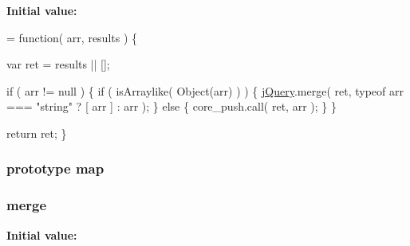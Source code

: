 {\bfseries Initial value\-:}
\begin{DoxyCode}
= \textcolor{keyword}{function}( arr, results ) \{


        var ret = results || [];

        \textcolor{keywordflow}{if} ( arr != null ) \{
            \textcolor{keywordflow}{if} ( isArraylike( Object(arr) ) ) \{
                \hyperlink{jquery-1_810_82-vsdoc_8js_add5237586d970a38a81f990e8eb28c6c}{jQuery}.merge( ret,
                    typeof arr === \textcolor{stringliteral}{"string"} ?
                    [ arr ] : arr
                );
            \} \textcolor{keywordflow}{else} \{
                core\_push.call( ret, arr );
            \}
        \}

        \textcolor{keywordflow}{return} ret;
    \}
\end{DoxyCode}
\hypertarget{jquery-1_810_82-vsdoc_8js_a20838f8c4bedc779e51bf830f5a4d471}{
\subsubsection[{map}]{ {\bf prototype} map}}\label{jquery-1_810_82-vsdoc_8js_a20838f8c4bedc779e51bf830f5a4d471}
\hypertarget{jquery-1_810_82-vsdoc_8js_a32b25eeaa50c1bd6453e8956949b36e3}{
\subsubsection[{merge}]{ merge}}\label{jquery-1_810_82-vsdoc_8js_a32b25eeaa50c1bd6453e8956949b36e3}
{\bfseries Initial value\-:}

